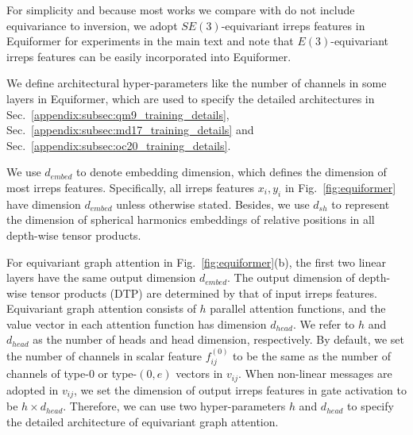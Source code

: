 
For simplicity and because most works we compare with do not include equivariance to inversion, we adopt $SE(3)$-equivariant irreps features in Equiformer for experiments in the main text and note that $E(3)$-equivariant irreps features can be easily incorporated into Equiformer.

We define architectural hyper-parameters like the number of channels in some layers in Equiformer, which are used to specify the detailed architectures in Sec.~\ref{appendix:subsec:qm9_training_details}, Sec.~\ref{appendix:subsec:md17_training_details} and Sec.~\ref{appendix:subsec:oc20_training_details}.

We use $d_{embed}$ to denote embedding dimension, which defines the dimension of most irreps features.
Specifically, all irreps features $x_i, y_i$ in Fig.~\ref{fig:equiformer} have dimension $d_{embed}$ unless otherwise stated.
Besides, we use $d_{sh}$ to represent the dimension of spherical harmonics embeddings of relative positions in all depth-wise tensor products.

For equivariant graph attention in Fig.~\ref{fig:equiformer}(b), the first two linear layers have the same output dimension $d_{embed}$.
The output dimension of depth-wise tensor products (DTP) are determined by that of input irreps features.
Equivariant graph attention consists of $h$ parallel attention functions, and the value vector in each attention function has dimension $d_{head}$.
We refer to $h$ and $d_{head}$ as the number of heads and head dimension, respectively.
By default, we set the number of channels in scalar feature $f_{ij}^{(0)}$ to be the same as the number of channels of type-$0$ or type-$(0, e)$ vectors in $v_{ij}$.
When non-linear messages are adopted in $v_{ij}$, we set the dimension of output irreps features in gate activation to be $h \times d_{head}$.
Therefore, we can use two hyper-parameters $h$ and $d_{head}$ to specify the detailed architecture of equivariant graph attention.

